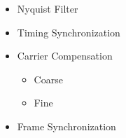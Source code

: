 \documentclass[conference,onecolumn]{IEEEtran}
\begin{document}


\begin{itemize}
	\item Nyquist Filter
	\item Timing Synchronization
	\item Carrier Compensation
	\begin{itemize}
		\item Coarse
		\item Fine
	\end{itemize}
	\item Frame Synchronization
\end{itemize}

\nocite{5586866}
\nocite{a2008_us8260192b2}
\nocite{marko_2012_us8667344b2}
\nocite{collins_2018_softwaredefined}
\nocite{chaudhari_2022_timing}
\nocite{650240}

{}
%
\end{document}
